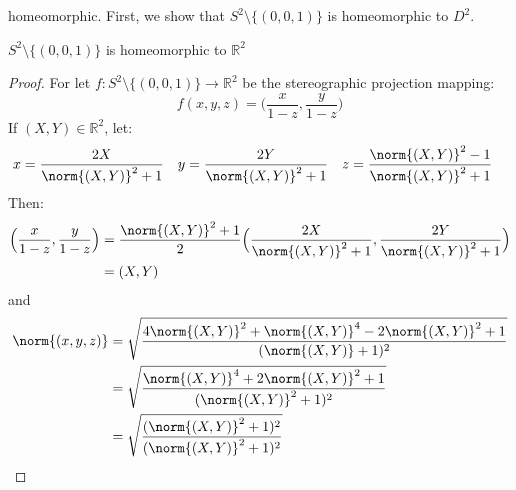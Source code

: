 \documentclass[crop=false,class=book,oneside]{standalone}                      %
\begin{document}
            homeomorphic. First, we show that
            $S^{2}\setminus\{(0,0,1)\}$ is homeomorphic to $D^{2}$.
            \begin{theorem}
                \label{theorem:surgery_theory_the_sphere_with_a_%
                       point_removed_is_homeomorphic_to_the_plane}
                $S^{2}\setminus\{(0,0,1)\}$ is homeomorphic to $\mathbb{R}^{2}$
            \end{theorem}
            \begin{proof}
                For let
                $f:S^{2}\setminus\{(0,0,1)\}%
                 \rightarrow \mathbb{R}^{2}$
                be the stereographic projection mapping:
                \begin{equation}
                    f(x,y,z)=\Big(\frac{x}{1-z},\frac{y}{1-z}\Big)
                \end{equation}
                If $(X,Y)\in\mathbb{R}^{2}$, let:
                \begin{align*}
                    x&=\frac{2X}{\norm{(X,Y)}^{2}+1}&
                    y&=\frac{2Y}{\norm{(X,Y)}^{2}+1}&
                    z&=\frac{\norm{(X,Y)}^{2}-1}{\norm{(X,Y)}^{2}+1} 
                \end{align*}
                Then:
                \begin{subequations}
                    \begin{align}
                        \Big(\frac{x}{1-z},\frac{y}{1-z}\Big)
                        &=\frac{\norm{(X,Y)}^{2}+1}{2}
                        \Big(\frac{2X}{\norm{(X,Y)}^{2}+ 1},
                             \frac{2Y}{\norm{(X,Y)}^{2}+1}\Big)\\
                        &=(X,Y)
                    \end{align}
                \end{subequations}
                and
                \begin{subequations}
                    \begin{align}
                        \norm{(x,y,z)}
                        &=\sqrt{\frac{4\norm{(X,Y)}^{2}
                                      +\norm{(X,Y)}^{4}
                                      -2\norm{(X,Y)}^{2}+1}{(\norm{(X,Y)}+1)^{2}}}\\
                        &=\sqrt{\frac{\norm{(X,Y)}^{4}+2\norm{(X,Y)}^{2}+1}
                                {(\norm{(X,Y)}^{2}+1)^{2}}}\\
                        &=\sqrt{\frac{(\norm{(X,Y)}^{2}+1)^{2}}{(\norm{(X,Y)}^{2}+1)^{2}}}

\end{align}
\end{subequations}
\end{proof}
\end{document}
